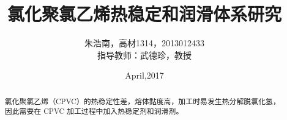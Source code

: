 \documentclass[a4paper, oneside, onecolumn, notitlepage, 12pt]{ctexrep}    %
\title{\sanhao 氯化聚氯乙烯热稳定和润滑体系研究}
\author{
    \wuhao 朱浩南，高材1314，2013012433\\
    \wuhao 指导教师：武德珍，教授
}
\date{April,2017}
\newcommand{\xiaosihao}{\fontsize{12pt}{\baselineskip}\selectfont}  %
\begin{document}
\maketitle

\begin{abstract}
    \xiaosihao 氯化聚氯乙烯（CPVC）的热稳定性差，熔体黏度高，加工时易发生热分解脱氯化氢，因此需要在 CPVC 加工过程中加入热稳定剂和润滑剂。
\end{abstract}


\tableofcontents






\clearpage
{}

\end{document}
